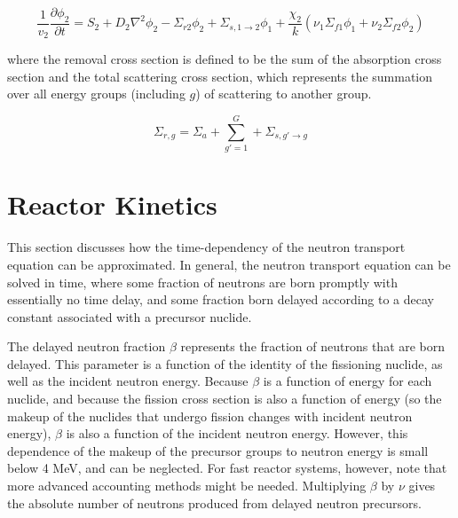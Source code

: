 \documentclass[10pt]{article}
\begin{document}
\begin{flushleft}
\begin{equation}
\label{Group2}
\frac{1}{v_2}\frac{\partial\phi_2}{\partial t}=S_2 + D_2\nabla^2\phi_2-\Sigma_{r2}\phi_2+\Sigma_{s, 1\rightarrow 2}\phi_1+\frac{\chi_2}{k}\left(\nu_1\Sigma_{f1}\phi_1+\nu_2\Sigma_{f2}\phi_2\right)
\end{equation}

where the removal cross section is defined to be the sum of the absorption cross section and the total scattering cross section, which represents the summation over all energy groups (including \(g\)) of scattering to another group. 

\begin{equation}
\label{RemovalCrossSection}
\Sigma_{r,g}=\Sigma_a+\sum_{g'=1}^{G}+\Sigma_{s, g'\rightarrow g}
\end{equation}










\clearpage
\section{Reactor Kinetics}

This section discusses how the time-dependency of the neutron transport equation can be approximated. In general, the neutron transport equation can be solved in time, where some fraction of neutrons are born promptly with essentially no time delay, and some fraction born delayed according to a decay constant associated with a precursor nuclide. 

The delayed neutron fraction \(\beta\) represents the fraction of neutrons that are born delayed. This parameter is a function of the identity of the fissioning nuclide, as well as the incident neutron energy. Because \(\beta\) is a function of energy for each nuclide, and because the fission cross section is also a function of energy (so the makeup of the nuclides that undergo fission changes with incident neutron energy), \(\beta\) is also a function of the incident neutron energy. However, this dependence of the makeup of the precursor groups to neutron energy is small below 4 MeV, and can be neglected. For fast reactor systems, however, note that more advanced accounting methods might be needed. Multiplying \(\beta\) by \(\nu\) gives the absolute number of neutrons produced from delayed neutron precursors. 


\end{flushleft}
\end{document}
